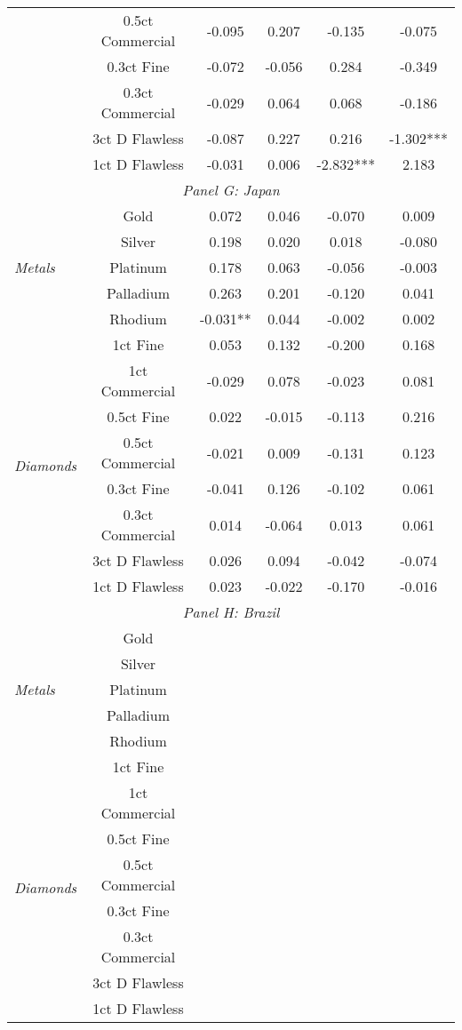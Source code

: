 \begin{tabularx}{1\textwidth}{Xccccc}
								& 0.5ct Commercial & -0.095 & 0.207 & -0.135 & -0.075 \\
								& 0.3ct Fine & -0.072 & -0.056 & 0.284 & -0.349 \\
								& 0.3ct Commercial & -0.029 & 0.064 & 0.068 & -0.186 \\
								& 3ct D Flawless & -0.087 & 0.227 & 0.216 & -1.302*** \\
								& 1ct D Flawless & -0.031 & 0.006 & -2.832*** & 2.183 \\
\midrule
\multicolumn{6}{c}{\emph{Panel G: Japan}} \\
\multirow{5}{*}{\emph{Metals}} & Gold & 0.072 & 0.046 & -0.070 & 0.009 \\
								& Silver & 0.198 & 0.020 & 0.018 & -0.080 \\
								& Platinum & 0.178 & 0.063 & -0.056 & -0.003 \\
								& Palladium & 0.263 & 0.201 & -0.120 & 0.041 \\
								& Rhodium & -0.031** & 0.044 & -0.002 & 0.002 \\
\midrule
\multirow{8}{*}{\emph{Diamonds}} & 1ct Fine & 0.053 & 0.132 & -0.200 & 0.168 \\
								& 1ct Commercial & -0.029 & 0.078 & -0.023 & 0.081 \\
								& 0.5ct Fine & 0.022 & -0.015 & -0.113 & 0.216 \\
								& 0.5ct Commercial & -0.021 & 0.009 & -0.131 & 0.123 \\
								& 0.3ct Fine & -0.041 & 0.126 & -0.102 & 0.061 \\
								& 0.3ct Commercial & 0.014 & -0.064 & 0.013 & 0.061 \\
								& 3ct D Flawless & 0.026 & 0.094 & -0.042 & -0.074  \\
								& 1ct D Flawless & 0.023 & -0.022 & -0.170 & -0.016 \\
\midrule
\multicolumn{6}{c}{\emph{Panel H: Brazil}} \\
\multirow{5}{*}{\emph{Metals}} & Gold &  &  &  &  \\
								& Silver &  &  &  &  \\
								& Platinum &  &  &  &  \\
								& Palladium &  &  &  &  \\
								& Rhodium &  &  &  &  \\
\midrule
\multirow{8}{*}{\emph{Diamonds}} & 1ct Fine &  &  &  &  \\
								& 1ct Commercial &  &  &  &  \\
								& 0.5ct Fine &  &  &  &  \\
								& 0.5ct Commercial &  &  &  &  \\
								& 0.3ct Fine &  &  &  &  \\
								& 0.3ct Commercial &  &  &  &  \\
								& 3ct D Flawless &  &  &  &  \\
								& 1ct D Flawless &  &  &  &  \\
\bottomrule
\end{tabularx}